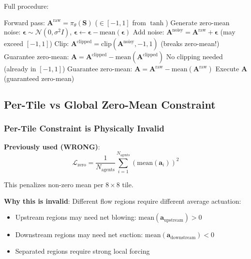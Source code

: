 \documentclass[11pt,a4paper]{article}
\theoremstyle{definition}
\begin{document}
Full procedure:
\begin{algorithm}
\caption{Differentiable Zero-Mean with Noise Handling}
\begin{algorithmic}[1]
\STATE Forward pass: $\mathbf{A}^{\text{raw}} = \pi_\theta(\mathbf{S})$ \quad ($\in [-1,1]$ from $\tanh$)
    \STATE Generate zero-mean noise: $\boldsymbol{\epsilon} \sim \mathcal{N}(0, \sigma^2 I)$, $\boldsymbol{\epsilon} \leftarrow \boldsymbol{\epsilon} - \text{mean}(\boldsymbol{\epsilon})$
    \STATE Add noise: $\mathbf{A}^{\text{noisy}} = \mathbf{A}^{\text{raw}} + \boldsymbol{\epsilon}$ \quad (may exceed $[-1,1]$)
    \STATE Clip: $\mathbf{A}^{\text{clipped}} = \text{clip}(\mathbf{A}^{\text{noisy}}, -1, 1)$ \quad (breaks zero-mean!)
    \STATE Guarantee zero-mean: $\mathbf{A} = \mathbf{A}^{\text{clipped}} - \text{mean}(\mathbf{A}^{\text{clipped}})$
\ELSE
    \STATE No clipping needed (already in $[-1,1]$)
    \STATE Guarantee zero-mean: $\mathbf{A} = \mathbf{A}^{\text{raw}} - \text{mean}(\mathbf{A}^{\text{raw}})$
\ENDIF
\STATE Execute $\mathbf{A}$ (guaranteed zero-mean)
\end{algorithmic}
\end{algorithm}

\subsection{Per-Tile vs Global Zero-Mean Constraint}

\subsubsection{Per-Tile Constraint is Physically Invalid}

\textbf{Previously used (WRONG)}:
\begin{equation}
\mathcal{L}_{\text{zero}} = \frac{1}{N_{\text{agents}}}\sum_{i=1}^{N_{\text{agents}}} \left(\text{mean}(\mathbf{a}_i)\right)^2
\end{equation}

This penalizes non-zero mean per $8 \times 8$ tile.

\textbf{Why this is invalid}: Different flow regions require different average actuation:
\begin{itemize}
    \item Upstream regions may need net blowing: $\text{mean}(\mathbf{a}_{\text{upstream}}) > 0$
    \item Downstream regions may need net suction: $\text{mean}(\mathbf{a}_{\text{downstream}}) < 0$
    \item Separated regions require strong local forcing
\end{itemize}
\end{document}
